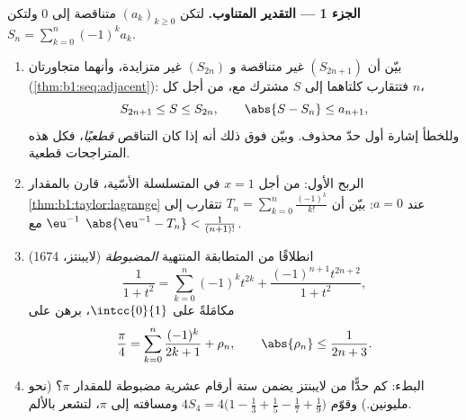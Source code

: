 \begin{problem}
\medskip
\noindent\textbf{الجزء 1 --- التقدير المتناوب.} لتكن
$(a_k)_{k \geq 0}$ متناقصة إلى $0$ ولتكن $S_n = \sum_{k=0}^{n}
(-1)^k a_k$.
\begin{enumerate}
  \item بيّن أن $(S_{2n+1})$ غير متناقصة و $(S_{2n})$
        غير متزايدة، وأنهما متجاورتان
        (\cref{thm:b1:seq:adjacent}): فتتقارب كلتاهما إلى
        $S$ مشترك مع، من أجل كل $n$،
        \[
        S_{2n+1} \leq S \leq S_{2n},
        \qquad
        \abs{S - S_n} \leq a_{n+1} ,
        \]
        وللخطأ إشارة أول حدّ محذوف.
        وبيّن فوق ذلك أنه إذا كان التناقص \emph{قطعيًا}، فكل
        هذه المتراجحات قطعية.
  \item الربح الأول: من أجل $x = 1$ في المتسلسلة الأسّية،
        قارن بالمقدار \cref{thm:b1:taylor:lagrange} عند $a = 0$:
        بيّن أن $T_n = \sum_{k=0}^{n} \frac{(-1)^k}{k!}$
        تتقارب إلى $\eu^{-1}$ مع $\abs{\eu^{-1} - T_n} <
        \frac{1}{(n+1)!}$.
  \item (لايبنتز، 1674) انطلاقًا من المتطابقة المنتهية \emph{المضبوطة}
        \[
        \frac{1}{1 + t^2} = \sum_{k=0}^{n} (-1)^k t^{2k}
        + \frac{(-1)^{n+1} t^{2n+2}}{1 + t^2} ,
        \]
        مكامَلةً على $\intcc{0}{1}$، برهن على
        \[
        \frac\pi4 = \sum_{k=0}^{n} \frac{(-1)^k}{2k+1} + \rho_n,
        \qquad \abs{\rho_n} \leq \frac{1}{2n+3} .
        \]
  \item البطء: كم حدًّا من لايبنتز يضمن ستة أرقام عشرية
        مضبوطة للمقدار $\pi$؟ (نحو مليونين.) وقوّم $4 S_4
        = 4\bigl(1 - \frac13 + \frac15 - \frac17 +
        \frac19\bigr)$ ومسافته إلى $\pi$، لتشعر
        بالألم.
\end{enumerate}


\end{problem}
